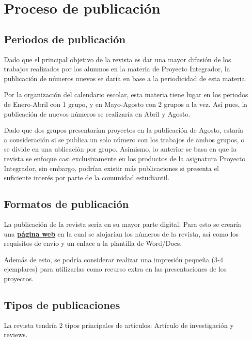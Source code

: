 \chapter{Proceso de publicación}

\section{Periodos de publicación}

Dado que el principal objetivo de la revista es dar una mayor difusión de los trabajos realizados por los alumnos en la materia de Proyecto Integrador, la publicación de números nuevos se daría en base a la periodicidad de esta materia.

Por la organización del calendario escolar, esta materia tiene lugar en los periodos de Enero-Abril con 1 grupo, y en Mayo-Agosto con 2 grupos a la vez. Así pues, la publicación de nuevos números se realizaría en Abril y Agosto.

Dado que dos grupos presentarían proyectos en la publicación de Agosto, estaría a consideración si se publica un solo número con los trabajos de ambos grupos, o se divide en una ublicación por grupo. Asímismo, lo anterior se basa en que la revista se enfoque casi exclusivamente en los productos de la asignatura Proyecto Integrador, sin embargo, podrían existir más publicaciones si presenta el suficiente interés por parte de la comunidad estudiantil.

\section{Formatos de publicación}

La publicación de la revista sería en su mayor parte digital. Para esto se crearía una \textbf{\href{https://darahraccoon.github.io/BT_Magazine/}{página web}} en la cual se alojarían los números de la revista, así como los requisitos de envío y un enlace a la plantilla de Word/Docs.

Además de esto, se podría considerar realizar una impresión pequeña (3-4 ejemplares) para utilizarlas como recurso extra en las presentaciones de los proyectos.

\section{Tipos de publicaciones}

La revista tendría 2 tipos principales de artículos: Artículo de investigación y reviews.

